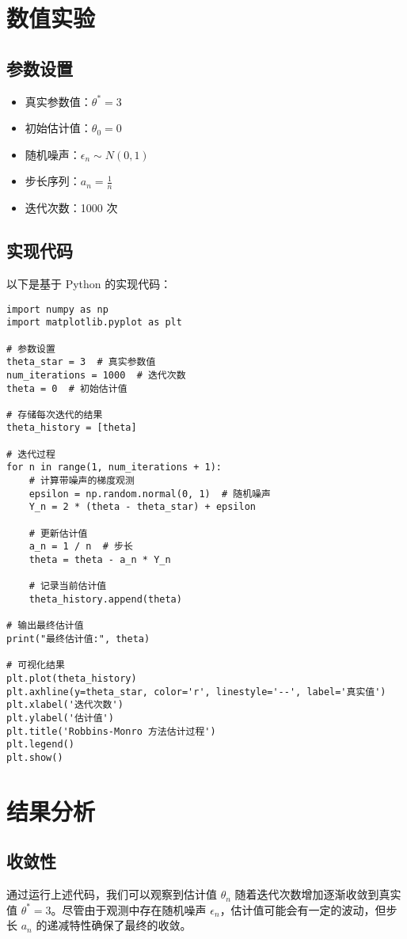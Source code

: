 \documentclass{article}
\begin{document}
\section{数值实验}
\subsection{参数设置}
\begin{itemize}
    \item 真实参数值：$\theta^* = 3$
    \item 初始估计值：$\theta_0 = 0$
    \item 随机噪声：$\epsilon_n \sim N(0, 1)$
    \item 步长序列：$a_n = \frac{1}{n}$
    \item 迭代次数：1000 次
\end{itemize}

\subsection{实现代码}
以下是基于 Python 的实现代码：
\begin{verbatim}
import numpy as np
import matplotlib.pyplot as plt

# 参数设置
theta_star = 3  # 真实参数值
num_iterations = 1000  # 迭代次数
theta = 0  # 初始估计值

# 存储每次迭代的结果
theta_history = [theta]

# 迭代过程
for n in range(1, num_iterations + 1):
    # 计算带噪声的梯度观测
    epsilon = np.random.normal(0, 1)  # 随机噪声
    Y_n = 2 * (theta - theta_star) + epsilon
    
    # 更新估计值
    a_n = 1 / n  # 步长
    theta = theta - a_n * Y_n
    
    # 记录当前估计值
    theta_history.append(theta)

# 输出最终估计值
print("最终估计值:", theta)

# 可视化结果
plt.plot(theta_history)
plt.axhline(y=theta_star, color='r', linestyle='--', label='真实值')
plt.xlabel('迭代次数')
plt.ylabel('估计值')
plt.title('Robbins-Monro 方法估计过程')
plt.legend()
plt.show()
\end{verbatim}

\section{结果分析}
\subsection{收敛性}
通过运行上述代码，我们可以观察到估计值 $\theta_n$ 随着迭代次数增加逐渐收敛到真实值 $\theta^* = 3$。尽管由于观测中存在随机噪声 $\epsilon_n$，估计值可能会有一定的波动，但步长 $a_n$ 的递减特性确保了最终的收敛。
\end{document}
